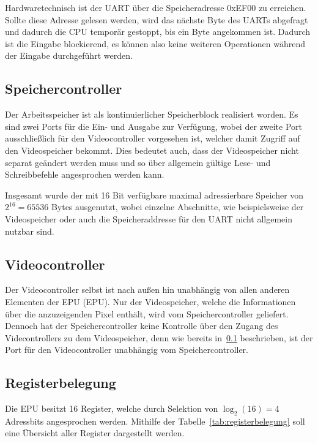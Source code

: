 Hardwaretechnisch ist der UART über die Speicheradresse 0xEF00 zu erreichen.
Sollte diese Adresse gelesen werden, wird das nächste Byte des UARTs abgefragt
und dadurch die CPU temporär gestoppt, bis ein Byte angekommen ist. Dadurch ist
die Eingabe blockierend, es können also keine weiteren Operationen während der
Eingabe durchgeführt werden.
\subsection{Speichercontroller}
\label{s:memorycontrol}
Der Arbeitsspeicher ist als kontinuierlicher Speicherblock realisiert worden. Es
sind zwei Ports für die Ein- und Ausgabe zur Verfügung, wobei der zweite Port
ausschließlich für den Videocontroller vorgesehen ist, welcher damit Zugriff auf
den Videospeicher bekommt. Dies bedeutet auch, dass der Videospeicher nicht
separat geändert werden muss und so über allgemein gültige Lese- und
Schreibbefehle angesprochen werden kann.

Insgesamt wurde der mit 16 Bit verfügbare maximal adressierbare Speicher von
$2^{16} = 65536$ Bytes ausgenutzt, wobei einzelne Abschnitte, wie beispielsweise
der Videospeicher oder auch die Speicheraddresse für den UART nicht allgemein nutzbar sind.
\subsection{Videocontroller}
\label{s:videocontrol}
Der Videocontroller selbst ist nach außen hin unabhängig von allen anderen
Elementen der \acl{EPU} (EPU). Nur der Videospeicher, welche die Informationen über die
anzuzeigenden Pixel enthält, wird vom Speichercontroller geliefert. Dennoch hat
der Speichercontroller keine Kontrolle über den Zugang des Videcontrollers zu
dem Videospeicher, denn wie bereits in~\ref{s:memorycontrol} beschrieben, ist der
Port für den Videocontroller unabhängig vom Speichercontroller.
\pagebreak
\subsection{Registerbelegung}
Die \ac{EPU} besitzt 16 Register, welche durch Selektion von $\log_2(16) = 4$
Adressbits angesprochen werden. Mithilfe der Tabelle~\ref{tab:registerbelegung}
soll eine Übersicht aller Register dargestellt werden.

